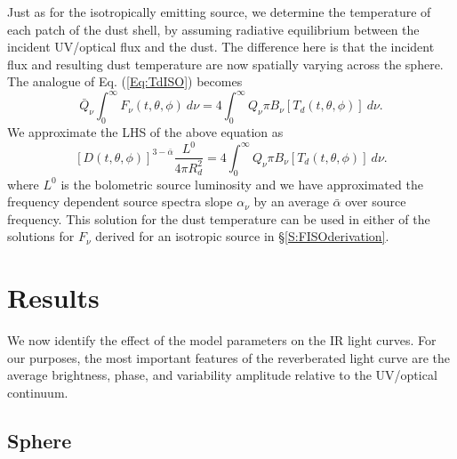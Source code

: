 Just as for the isotropically emitting source, we determine the temperature of
each patch of the dust shell, by assuming radiative equilibrium between the
incident UV/optical flux and the dust. The difference here is that the incident flux and resulting dust
temperature are now spatially varying across the sphere. The analogue of Eq.
(\ref{Eq:TdISO}) becomes
\begin{equation}
\label{Eq:TdDop1}
\bar{Q}_{\nu} \int^{\infty}_{0}{F_{\nu}(t, \theta, \phi)  \ d \nu } =   4 \int^{\infty}_{0}{Q_{\nu} \pi B_{\nu}\left[T_d(t,\theta, \phi)\right] \ d\nu}.
\end{equation}
We approximate the LHS of the above equation as
\begin{equation}
\label{Eq:TdDop}
\left[D(t, \theta, \phi)\right]^{3-\bar{\alpha}} \frac{L^0}{4 \pi R^2_d}  =   4 \int^{\infty}_{0}{Q_{\nu} \pi B_{\nu}\left[T_d(t,\theta, \phi)\right] \ d\nu}. 
\end{equation}
where $L^0$ is the bolometric source luminosity and we have approximated the
frequency dependent source spectra slope $\alpha_{\nu}$ by an average
$\bar{\alpha}$ over source frequency. This solution for the dust temperature
can be used in either of the solutions for $F_{\nu}$ derived for an isotropic
source in \S \ref{S:FISOderivation}.










\section{Results}
\label{S:PDs}

We now identify the effect of the model parameters on the IR light curves. For
our purposes, the most important features of the reverberated light curve are
the average brightness, phase, and variability amplitude relative to the
UV/optical continuum.







\subsection{Sphere} 
\label{S:Interp:Sphere} 

